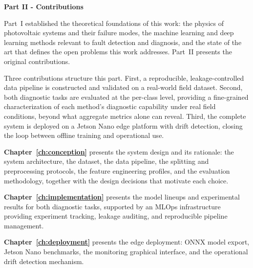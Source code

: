 
\newpage
\thispagestyle{plain}
\vspace*{2cm}

{\noindent\large\bfseries Part II - Contributions}

\vspace{1.2cm}

\noindent Part~I established the theoretical foundations of this work: the physics of photovoltaic systems and their failure modes, the machine learning and deep learning methods relevant to fault detection and diagnosis, and the state of the art that defines the open problems this work addresses. Part~II presents the original contributions.

\vspace{0.6cm}

\noindent Three contributions structure this part. First, a reproducible, leakage-controlled data pipeline is constructed and validated on a real-world field dataset. Second, both diagnostic tasks are evaluated at the per-class level, providing a fine-grained characterization of each method's diagnostic capability under real field conditions, beyond what aggregate metrics alone can reveal. Third, the complete system is deployed on a Jetson Nano edge platform with drift detection, closing the loop between offline training and operational use.

\vspace{0.6cm}

\noindent \textbf{Chapter~\ref{ch:conception}} presents the system design and its rationale: the system architecture, the dataset, the data pipeline, the splitting and preprocessing protocols, the feature engineering profiles, and the evaluation methodology, together with the design decisions that motivate each choice.

\noindent \textbf{Chapter~\ref{ch:implementation}} presents the model lineups and experimental results for both diagnostic tasks, supported by an MLOps infrastructure providing experiment tracking, leakage auditing, and reproducible pipeline management.

\noindent \textbf{Chapter~\ref{ch:deployment}} presents the edge deployment: ONNX model export, Jetson Nano benchmarks, the monitoring graphical interface, and the operational drift detection mechanism.

\clearpage
